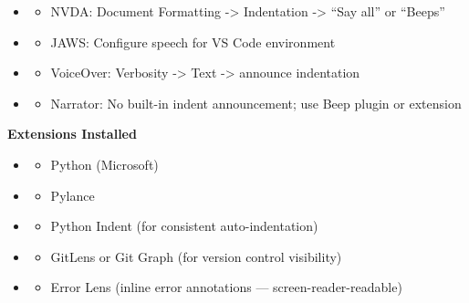 \documentclass[
  justified,
  openright,
]{tufte-book}
\providecommand{\tightlist}{%
  \setlength{\itemsep}{0pt}\setlength{\parskip}{0pt}}
\begin{document}
\begin{itemize}
\tightlist
\item
  \begin{itemize}
  \tightlist
  \item[$\square$]
    NVDA: Document Formatting -\textgreater{} Indentation
    -\textgreater{} ``Say all'' or ``Beeps''
  \end{itemize}
\item
  \begin{itemize}
  \tightlist
  \item[$\square$]
    JAWS: Configure speech for VS Code environment
  \end{itemize}
\item
  \begin{itemize}
  \tightlist
  \item[$\square$]
    VoiceOver: Verbosity -\textgreater{} Text -\textgreater{} announce
    indentation
  \end{itemize}
\item
  \begin{itemize}
  \tightlist
  \item[$\square$]
    Narrator: No built-in indent announcement; use Beep plugin or
    extension
  \end{itemize}
\end{itemize}

\textbf{Extensions Installed}

\begin{itemize}
\tightlist
\item
  \begin{itemize}
  \tightlist
  \item[$\square$]
    Python (Microsoft)
  \end{itemize}
\item
  \begin{itemize}
  \tightlist
  \item[$\square$]
    Pylance
  \end{itemize}
\item
  \begin{itemize}
  \tightlist
  \item[$\square$]
    Python Indent (for consistent auto-indentation)
  \end{itemize}
\item
  \begin{itemize}
  \tightlist
  \item[$\square$]
    GitLens or Git Graph (for version control visibility)
  \end{itemize}
\item
  \begin{itemize}
  \tightlist
  \item[$\square$]
    Error Lens (inline error annotations --- screen-reader-readable)
  \end{itemize}
\end{itemize}
\end{document}
